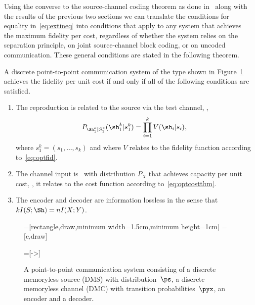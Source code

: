 Using the converse to the source-channel coding theorem as done
in~\cite{GastparThesis} along with the results of the previous two
sections we
can translate the conditions for equality in~\eqref{eq:extineq} into conditions
that apply to any system that achieves the maximum fidelity per cost, regardless
of whether the system relies on the separation principle, on joint
source-channel block coding, or on uncoded communication.  These general
conditions are stated in the following theorem.


\begin{theorem}
  \label{thm:bla}
  A discrete point-to-point communication system of the type shown in
  Figure~\ref{fig:scmodel} achieves the fidelity per unit cost if and only if
  all of the following conditions are satisfied.

\begin{enumerate}
  \item The reproduction is related to the source via the test channel, \ie,
    \[P_{\Sh_{1}^{k}|S_{1}^{k}}(\sh_{1}^{k}|s_{1}^{k})=\prod_{i=1}^k
    V(\sh_i|s_i), \]
    where $s_1^k =(s_1, \ldots, s_k)$     and where $V$ relates to the fidelity
    function according to~\eqref{eq:optfid}.
  \item The channel input is \iid\ with distribution $P_X$ that achieves
    capacity per unit cost, \ie, it relates to the cost function according
    to~\eqref{eq:optcostthm}.
  \item The encoder and decoder are information lossless in the sense that
    $kI(S;\Sh) = n I(X;Y)$.  
\end{enumerate}
\end{theorem}

\begin{figure}
  \begin{center}
  =[rectangle,draw,minimum width=1.5cm,minimum height=1cm]
  =[c,draw]

  =[->]
  \end{center}
  \caption{A point-to-point communication system consisting of a discrete
  memoryless source (DMS) with distribution~$\ps$, a discrete memoryless channel
  (DMC) with transition probabilities~$\pyx$, an encoder and a decoder.}
  \label{fig:scmodel}
\end{figure}


